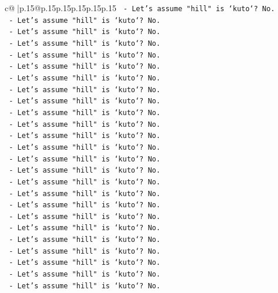 \documentclass{article}
\begin{document}
{\begin{supertabular}{c@{$\;$}|p{.15\linewidth}@{}p{.15\linewidth}p{.15\linewidth}p{.15\linewidth}p{.15\linewidth}p{.15\linewidth}}
{{{\texttt{                {-} Let's assume "hill" is `kuto`? No.} \\
\texttt{                {-} Let's assume "hill" is `kuto`? No.} \\
\texttt{                {-} Let's assume "hill" is `kuto`? No.} \\
\texttt{                {-} Let's assume "hill" is `kuto`? No.} \\
\texttt{                {-} Let's assume "hill" is `kuto`? No.} \\
\texttt{                {-} Let's assume "hill" is `kuto`? No.} \\
\texttt{                {-} Let's assume "hill" is `kuto`? No.} \\
\texttt{                {-} Let's assume "hill" is `kuto`? No.} \\
\texttt{                {-} Let's assume "hill" is `kuto`? No.} \\
\texttt{                {-} Let's assume "hill" is `kuto`? No.} \\
\texttt{                {-} Let's assume "hill" is `kuto`? No.} \\
\texttt{                {-} Let's assume "hill" is `kuto`? No.} \\
\texttt{                {-} Let's assume "hill" is `kuto`? No.} \\
\texttt{                {-} Let's assume "hill" is `kuto`? No.} \\
\texttt{                {-} Let's assume "hill" is `kuto`? No.} \\
\texttt{                {-} Let's assume "hill" is `kuto`? No.} \\
\texttt{                {-} Let's assume "hill" is `kuto`? No.} \\
\texttt{                {-} Let's assume "hill" is `kuto`? No.} \\
\texttt{                {-} Let's assume "hill" is `kuto`? No.} \\
\texttt{                {-} Let's assume "hill" is `kuto`? No.} \\
\texttt{                {-} Let's assume "hill" is `kuto`? No.} \\
\texttt{                {-} Let's assume "hill" is `kuto`? No.} \\
\texttt{                {-} Let's assume "hill" is `kuto`? No.} \\
\texttt{                {-} Let's assume "hill" is `kuto`? No.} \\
\texttt{                {-} Let's assume "hill" is `kuto`? No.} \\
}}}
\end{supertabular}}
\end{document}

